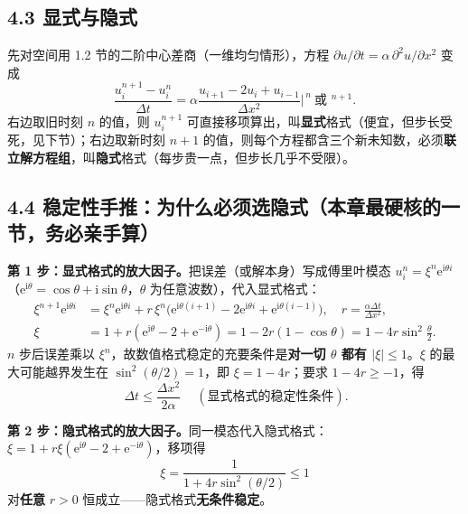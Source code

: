 \documentclass[12pt,a4paper]{ctexart}
\begin{document}
\subsection{4.3 显式与隐式}

先对空间用 1.2 节的二阶中心差商（一维均匀情形），方程 $\partial u/\partial t=\alpha\,\partial^2u/\partial x^2$ 变成
\begin{equation}
\frac{u_i^{n+1}-u_i^n}{\Delta t}
=\alpha\frac{u_{i+1}-2u_i+u_{i-1}}{\Delta x^2}\Big|^{\,n}\ \text{或}\ ^{\,n+1}.
\end{equation}
右边取旧时刻 $n$ 的值，则 $u_i^{n+1}$ 可直接移项算出，叫\textbf{显式}格式（便宜，但步长受死，见下节）；右边取新时刻 $n+1$ 的值，则每个方程都含三个新未知数，必须\textbf{联立解方程组}，叫\textbf{隐式}格式（每步贵一点，但步长几乎不受限）。

\subsection{4.4 稳定性手推：为什么必须选隐式（本章最硬核的一节，务必亲手算）}

\textbf{第 1 步：显式格式的放大因子。}把误差（或解本身）写成傅里叶模态 $u_i^n=\xi^n\mathrm{e}^{\mathrm{i}\theta i}$（$\mathrm{e}^{\mathrm{i}\theta}=\cos\theta+\mathrm{i}\sin\theta$，$\theta$ 为任意波数），代入显式格式：
\begin{align}
\xi^{n+1}\mathrm{e}^{\mathrm{i}\theta i}
&=\xi^n\mathrm{e}^{\mathrm{i}\theta i}
+r\,\xi^n\bigl(\mathrm{e}^{\mathrm{i}\theta(i+1)}-2\mathrm{e}^{\mathrm{i}\theta i}+\mathrm{e}^{\mathrm{i}\theta(i-1)}\bigr),
\quad r=\frac{\alpha\Delta t}{\Delta x^2},\\
\xi&=1+r(\mathrm{e}^{\mathrm{i}\theta}-2+\mathrm{e}^{-\mathrm{i}\theta})
=1-2r(1-\cos\theta)=1-4r\sin^2\frac{\theta}{2}.
\end{align}
$n$ 步后误差乘以 $\xi^n$，故数值格式稳定的充要条件是\textbf{对一切 $\theta$ 都有 $|\xi|\le1$}。$\xi$ 的最大可能越界发生在 $\sin^2(\theta/2)=1$，即 $\xi=1-4r$；要求 $1-4r\ge-1$，得
\begin{equation}
\boxed{\ \Delta t\le\frac{\Delta x^2}{2\alpha}\ }
\quad(\text{显式格式的稳定性条件}).
\end{equation}

\textbf{第 2 步：隐式格式的放大因子。}同一模态代入隐式格式：$\xi=1+r\xi(\mathrm{e}^{\mathrm{i}\theta}-2+\mathrm{e}^{-\mathrm{i}\theta})$，移项得
\begin{equation}
\xi=\frac{1}{1+4r\sin^2(\theta/2)}\le1
\end{equation}
对\textbf{任意} $r>0$ 恒成立——隐式格式\textbf{无条件稳定}。
\end{document}
